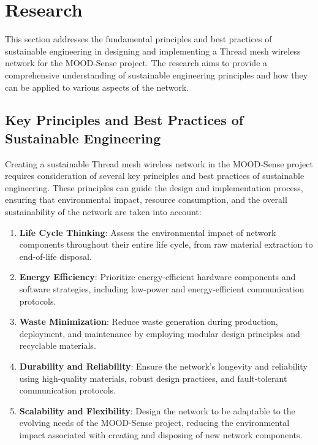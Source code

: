 \chapter{Research}\label{chap:research}

This section addresses the fundamental principles and best practices of sustainable engineering in designing and implementing a Thread mesh wireless network for the MOOD-Sense project. The research aims to provide a comprehensive understanding of sustainable engineering principles and how they can be applied to various aspects of the network.


\section{Key Principles and Best Practices of Sustainable Engineering}

Creating a sustainable Thread mesh wireless network in the MOOD-Sense project requires consideration of several key principles and best practices of sustainable engineering. These principles can guide the design and implementation process, ensuring that environmental impact, resource consumption, and the overall sustainability of the network are taken into account:

\begin{enumerate}
    \item \textbf{Life Cycle Thinking}: Assess the environmental impact of network components throughout their entire life cycle, from raw material extraction to end-of-life disposal.
    \item \textbf{Energy Efficiency}: Prioritize energy-efficient hardware components and software strategies, including low-power and energy-efficient communication protocols.
    \item \textbf{Waste Minimization}: Reduce waste generation during production, deployment, and maintenance by employing modular design principles and recyclable materials.
    \item \textbf{Durability and Reliability}: Ensure the network's longevity and reliability using high-quality materials, robust design practices, and fault-tolerant communication protocols.
    \item \textbf{Scalability and Flexibility}: Design the network to be adaptable to the evolving needs of the MOOD-Sense project, reducing the environmental impact associated with creating and disposing of new network components.
\end{enumerate}

